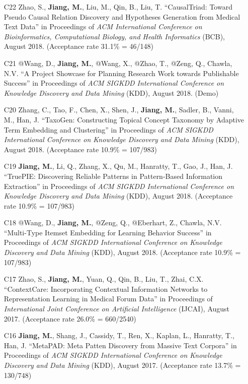 \documentclass[10pt]{article}
\newenvironment{myindentpar}[1]%
{\begin{list}{}%
         {\setlength{\leftmargin}{#1}}%
         \item[]%
}
{\end{list}}
\newcounter{list}
\begin{document}
\begin{myindentpar}{0.00cm}
\begin{enumerate}[leftmargin=.5cm]
\item[C22] Zhao, S., \textbf{Jiang, M.}, Liu, M., Qin, B., Liu, T. ``CausalTriad: Toward Pseudo Causal Relation Discovery and Hypotheses Generation from Medical Text Data'' in Proceedings of \textit{ACM International Conference on Bioinformatics, Computational Biology, and Health Informatics} (BCB), August 2018. (Acceptance rate 31.1\% = 46/148)

\item[C21] @Wang, D., \textbf{Jiang, M.}, @Wang, X., @Zhao, T., @Zeng, Q., Chawla, N.V. ``A Project Showcase for Planning Research Work towards Publishable Success'' in Proceedings of \textit{ACM SIGKDD International Conference on Knowledge Discovery and Data Mining} (KDD), August 2018. (Demo)

\item[C20] Zhang, C., Tao, F., Chen, X., Shen, J., \textbf{Jiang, M.}, Sadler, B., Vanni, M., Han, J. ``TaxoGen: Constructing Topical Concept Taxonomy by Adaptive Term Embedding and Clustering'' in Proceedings of \textit{ACM SIGKDD International Conference on Knowledge Discovery and Data Mining} (KDD), August 2018. (Acceptance rate 10.9\% = 107/983)

\item[C19] \textbf{Jiang, M.}, Li, Q., Zhang, X., Qu, M., Hanratty, T., Gao, J., Han, J. ``TruePIE: Discovering Reliable Patterns in Pattern-Based Information Extraction'' in Proceedings of \textit{ACM SIGKDD International Conference on Knowledge Discovery and Data Mining} (KDD), August 2018. (Acceptance rate 10.9\% = 107/983)
	
\item[C18] @Wang, D., \textbf{Jiang, M.}, @Zeng, Q., @Eberhart, Z., Chawla, N.V. ``Multi-Type Itemset Embedding for Learning Behavior Success'' in Proceedings of \textit{ACM SIGKDD International Conference on Knowledge Discovery and Data Mining} (KDD), August 2018. (Acceptance rate 10.9\% = 107/983)

\item[C17] Zhao, S., \textbf{Jiang, M.}, Yuan, Q., Qin, B., Liu, T., Zhai, C.X. ``ContextCare: Incorporating Contextual Information Networks to Representation Learning in Medical Forum Data'' in Proceedings of \textit{International Joint Conference on Artificial Intelligence} (IJCAI), August 2017. (Acceptance rate 26.0\% = 660/2540)

\item[C16] \textbf{Jiang, M.}, Shang, J., Cassidy, T., Ren, X., Kaplan, L., Hanratty, T., Han, J. ``MetaPAD: Meta Patten Discovery from Massive Text Corpora'' in Proceedings of \textit{ACM SIGKDD International Conference on Knowledge Discovery and Data Mining} (KDD), August 2017. (Acceptance rate 13.7\% = 130/748)


\end{enumerate}
\end{myindentpar}
\end{document}
